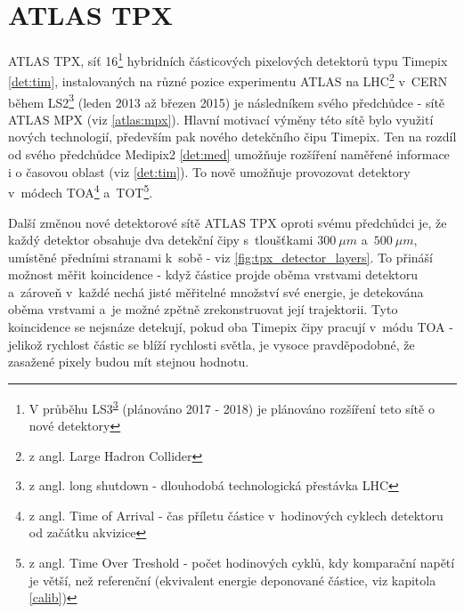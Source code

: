 

\chapter{ATLAS TPX}\label{atlas}
ATLAS TPX, síť 16\footnote{V průběhu LS3\textsuperscript{\ref{ls}} (plánováno 2017 - 2018) je plánováno rozšíření teto sítě o nové detektory} hybridních částicových pixelových detektorů typu Timepix \ref{det:tim}, instalovaných na různé pozice experimentu ATLAS na LHC\footnote{z angl. Large Hadron Collider} v~CERN během LS2\footnote{\label{ls}z angl. long shutdown - dlouhodobá technologická přestávka LHC} (leden 2013 až březen 2015) je následníkem svého předchůdce - sítě ATLAS MPX (viz \ref{atlas:mpx}). Hlavní motivací výměny této sítě bylo využití nových technologií, především pak nového detekčního čipu Timepix. Ten na rozdíl od svého předchůdce Medipix2 \ref{det:med} umožňuje rozšíření naměřené informace i o časovou oblast (viz \ref{det:tim}). To nově umožňuje provozovat detektory v~módech TOA\footnote{z angl. Time of Arrival - čas příletu částice v~hodinových cyklech detektoru od začátku akvizice} a~TOT\footnote{z angl. Time Over Treshold - počet hodinových cyklů, kdy komparační napětí je větší, než referenční (ekvivalent energie deponované částice, viz kapitola \ref{calib})}. 

Další změnou nové detektorové sítě ATLAS TPX oproti svému předchůdci je, že každý detektor obsahuje dva detekční čipy s~tloušťkami $300~\mu m$ a~$500~\mu m$, umístěné předními stranami k~sobě - viz \ref{fig:tpx_detector_layers}. To přináší možnost měřit koincidence - když částice projde oběma vrstvami  detektoru a~zároveň v~každé nechá jisté měřitelné množství své energie, je detekována oběma vrstvami a~je možné zpětně zrekonstruovat její trajektorii. Tyto koincidence se nejsnáze detekují, pokud oba Timepix čipy pracují v~módu TOA - jelikož rychlost částic se blíží rychlosti světla, je vysoce pravděpodobné, že zasažené pixely budou mít stejnou hodnotu.



